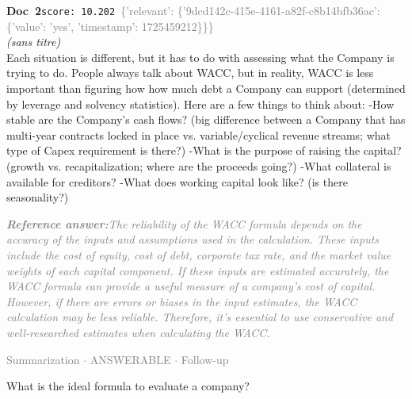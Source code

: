\documentclass[a4paper,11pt]{article}
\begin{document}
\begin{docenv}
{\footnotesize\textcolor{doccolor}{\textbf{Doc~2}}}\hfill{\tiny\texttt{score:~10.202}}\ {\tiny\textcolor{gray}{\{'relevant': \{'9dcd142c-415e-4161-a82f-c8b14bfb36ac': \{'value': 'yes', 'timestamp': 1725459212\}\}\}}}\\[3pt]
{\small\textit{(sans titre)}}\\[2pt]
\vspace{2pt}
{\footnotesize 
Each situation is different, but it has to do with assessing what the Company is trying to do. People always talk about WACC, but in reality, WACC is less important than figuring how how much debt a Company can support (determined by leverage and solvency statistics).  Here are a few things to think about:  -How stable are the Company's cash flows? (big difference between a Company that has multi-year contracts locked in place vs. variable/cyclical revenue streams; what type of Capex requirement is there?)  -What is the purpose of raising the capital? (growth vs. recapitalization; where are the proceeds going?)  -What collateral is available for creditors?  -What does working capital look like? (is there seasonality?)}
\end{docenv}
\begin{refanswerenv}
{\footnotesize\textit{\textcolor{gray}{\textbf{Reference answer:}\enspace The reliability of the WACC formula depends on the accuracy of the inputs and assumptions used in the calculation. These inputs include the cost of equity, cost of debt, corporate tax rate, and the market value weights of each capital component. If these inputs are estimated accurately, the WACC formula can provide a useful measure of a company's cost of capital. However, if there are errors or biases in the input estimates, the WACC calculation may be less reliable. Therefore, it's essential to use conservative and well-researched estimates when calculating the WACC.}}}
\end{refanswerenv}
\vspace{0.5em}
\hfill{\tiny\textcolor{gray}{Summarization $\cdot$ ANSWERABLE $\cdot$ Follow-up}}
\begin{userbubble}
What is the ideal formula to evaluate a company?
\end{userbubble}
\end{document}
